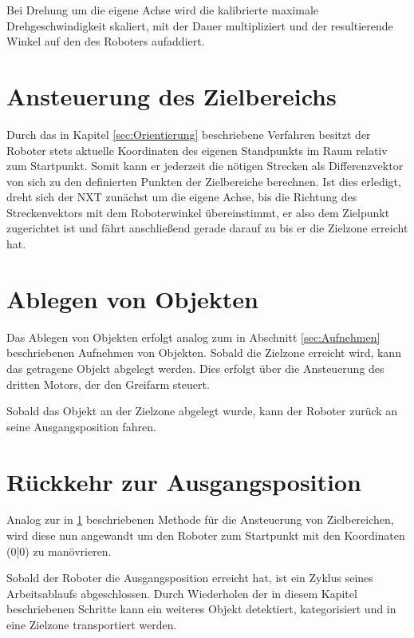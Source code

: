 Bei Drehung um die eigene Achse wird die kalibrierte maximale Drehgeschwindigkeit skaliert, mit der Dauer multipliziert und der resultierende Winkel auf den des Roboters aufaddiert.

\section{Ansteuerung des Zielbereichs}
\label{sec:Zielbereichsansteuerung}

Durch das in Kapitel \ref{sec:Orientierung} beschriebene Verfahren besitzt der Roboter stets aktuelle Koordinaten des eigenen Standpunkts im Raum relativ zum Startpunkt. Somit kann er jederzeit die nötigen Strecken als Differenzvektor von sich zu den definierten Punkten der Zielbereiche berechnen. Ist dies erledigt, dreht sich der NXT zunächst um die eigene Achse, bis die Richtung des Streckenvektors mit dem Roboterwinkel übereinstimmt, er also dem Zielpunkt zugerichtet ist und fährt anschließend gerade darauf zu bis er die Zielzone erreicht hat.


\section{Ablegen von Objekten}

Das Ablegen von Objekten erfolgt analog zum in Abschnitt \ref{sec:Aufnehmen} beschriebenen Aufnehmen von Objekten. Sobald die Zielzone erreicht wird, kann das getragene Objekt abgelegt werden. Dies erfolgt über die Ansteuerung des dritten Motors, der den Greifarm steuert. 

Sobald das Objekt an der Zielzone abgelegt wurde, kann der Roboter zurück an seine Ausgangsposition fahren. 

\section{Rückkehr zur Ausgangsposition}

Analog zur in \ref{sec:Zielbereichsansteuerung} beschriebenen Methode für die Ansteuerung von Zielbereichen, wird diese nun angewandt um den Roboter zum Startpunkt mit den Koordinaten (0|0) zu manövrieren.

Sobald der Roboter die Ausgangsposition erreicht hat, ist ein Zyklus seines Arbeitsablaufs abgeschlossen. Durch Wiederholen der in diesem Kapitel beschriebenen Schritte kann ein weiteres Objekt detektiert, kategorisiert und in eine Zielzone transportiert werden. 